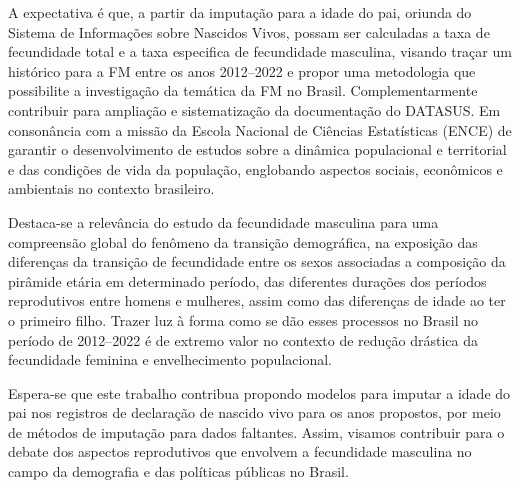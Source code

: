 

A expectativa é que, a partir da imputação para a idade do pai, oriunda do Sistema de Informações sobre Nascidos Vivos, possam ser calculadas a taxa de fecundidade total e a taxa especifica de fecundidade masculina, visando traçar um histórico para a FM entre os anos 2012–2022 e propor uma metodologia que possibilite a investigação da temática da FM no Brasil. Complementarmente contribuir para ampliação e sistematização da documentação do DATASUS. Em consonância com a missão da Escola Nacional de Ciências Estatísticas (ENCE) de garantir o desenvolvimento de estudos sobre a dinâmica populacional e territorial e das condições de vida da população, englobando aspectos sociais, econômicos e ambientais no contexto brasileiro.

Destaca-se a relevância do estudo da fecundidade masculina para uma
compreensão global do fenômeno da transição demográfica, na exposição das
diferenças da transição de fecundidade entre os sexos associadas a composição da
pirâmide etária em determinado período, das diferentes durações dos períodos
reprodutivos entre homens e mulheres, assim como das diferenças de idade ao ter o primeiro filho. Trazer luz à forma como se dão esses processos no Brasil no período de 2012–2022 é de extremo valor no contexto de redução drástica da fecundidade feminina e envelhecimento populacional.

Espera-se que este trabalho contribua propondo modelos para imputar a idade do pai nos registros de declaração de nascido vivo para os anos propostos, por meio de métodos de imputação para dados faltantes. Assim, visamos contribuir para o debate dos aspectos reprodutivos que envolvem a fecundidade masculina no campo da demografia e das políticas públicas no Brasil.




\begin{comment}

    
    \textbf{\textit{\textcolor{blue}{Justificativa é com base na literatura,
    já a Motivação pode ter questões pessoais}}}
    ------------------
    
    
    \textcolor{blue}{Motivação}
    
    
    [Relevância para o cenário brasileiro]
    
    [envelhecimento da população] -- entendimento dos padrões de fecundidade masculina ajudam a entender as escolhas reprodutivas, força da escolha do pai por ter filhos?
    
    
    Portanto, justifica-se a relevância da temática no contexto da transição demográfica brasileira no sentido de que, para obtermos uma visão completa dos determinantes do fenômeno, é preciso analisar  a FM ao longo do tempo e nas diferentes regiões.

\end{comment}